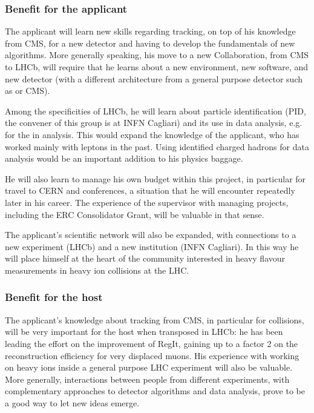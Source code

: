 \documentclass[a4paper,11pt]{article}
\begin{document}
\subsubsection{Benefit for the applicant}
\label{sec:benefitapplicant}

The applicant will learn new skills regarding tracking, on top of his knowledge from CMS, for a new detector and having to develop the fundamentals of new algorithms. More generally speaking, his move to a new Collaboration, from CMS to LHCb, will require that he learns about a new environment, new software, and new detector (with a different architecture from a general purpose detector such as \DO or CMS). 

Among the specificities of LHCb, he will learn about particle identification (PID, the convener of this group is at INFN Cagliari) and its use in data analysis, e.g. for the \Dz in \pbpb analysis. 
This would expand the knowledge of the applicant, who has worked mainly with leptons in the past. Using identified charged hadrons for data analysis would be an important addition to his physics baggage.

He will also learn to manage his own budget within this project, in particular for travel to CERN and conferences, a situation that he will encounter repeatedly later in his career. The experience of the supervisor with managing projects, including the ERC Consolidator Grant, will be valuable in that sense.

The applicant's scientific network will also be expanded, with connections to a new experiment (LHCb) and a new institution (INFN Cagliari). In this way he will place himself at the heart of the community interested in heavy flavour measurements in heavy ion collisions at the LHC.



\subsubsection{Benefit for the host}

The applicant's knowledge about tracking from CMS, in particular for \pbpb collisions, will be very important for the host when transposed in LHCb: he has been leading the effort on the improvement of RegIt, gaining up to a factor 2 on the reconstruction efficiency for very displaced muons. His experience with working on heavy ions inside a general purpose LHC experiment will also be valuable. More generally, interactions between people from different experiments, with complementary approaches to detector algorithms and data analysis, prove to be a good way to let new ideas emerge. 
\end{document}
